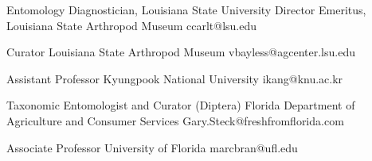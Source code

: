 \documentclass{article}
\begin{document}

{Entomology Diagnostician, Louisiana State University}
{Director Emeritus, Louisiana State Arthropod Museum}
{ccarlt@lsu.edu}

{Curator}
{Louisiana State Arthropod Museum}
{vbayless@agcenter.lsu.edu}

{Assistant Professor}
{Kyungpook National University}
{ikang@knu.ac.kr}

{Taxonomic Entomologist and Curator (Diptera)}
{Florida Department of Agriculture and Consumer Services}
{Gary.Steck@freshfromflorida.com}

{Associate Professor}
{University of Florida}
{marcbran@ufl.edu}
 
\end{document}
